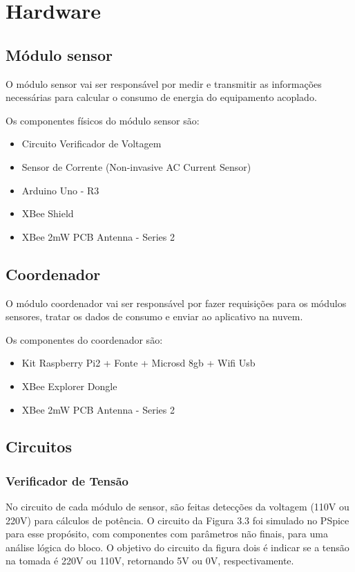\section{Hardware}
\label{Sec:hardware}
\subsection{Módulo sensor}

O módulo sensor vai ser responsável por medir e transmitir as informações necessárias para calcular o consumo de energia do equipamento acoplado.

Os componentes físicos do módulo sensor são:

\begin{itemize}
\item Circuito Verificador de Voltagem
\item Sensor de Corrente (Non-invasive AC Current Sensor)
\item Arduino Uno - R3
\item XBee Shield
\item XBee 2mW PCB Antenna - Series 2
\end{itemize}
%
\subsection{Coordenador}

O módulo coordenador vai ser responsável por fazer requisições para os módulos sensores, tratar os dados de consumo e enviar ao aplicativo na nuvem.

Os componentes do coordenador são:

\begin{itemize}
\item Kit Raspberry Pi2 + Fonte + Microsd 8gb + Wifi Usb
\item XBee Explorer Dongle
\item XBee 2mW PCB Antenna - Series 2
\end{itemize}
%
\subsection{Circuitos}
\subsubsection{Verificador de Tensão}

No circuito de cada módulo de sensor, são feitas detecções da voltagem (110V ou 220V) para cálculos de potência. O circuito da Figura 3.3 foi simulado no PSpice para esse propósito, com componentes com parâmetros não finais, para uma análise lógica do bloco. O objetivo do circuito da figura dois é indicar se a tensão na tomada é 220V ou 110V, retornando 5V ou 0V, respectivamente.

